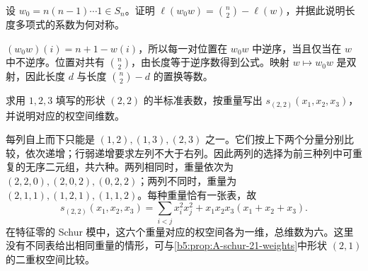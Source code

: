 \begin{exercise}\label{b5:ex:A-longest-complement}
	设 \(w_0=n(n-1)\cdots1\in S_n\)。证明 \(\ell(w_0w)=\binom n2-\ell(w)\)，并据此说明长度多项式的系数为何对称。
\end{exercise}
\begin{solution}
	\((w_0w)(i)=n+1-w(i)\)，所以每一对位置在 \(w_0w\) 中逆序，当且仅当在 \(w\) 中不逆序。位置对共有 \(\binom n2\)，由长度等于逆序数得到公式。映射 \(w\mapsto w_0w\) 是双射，因此长度 \(d\) 与长度 \(\binom n2-d\) 的置换等数。
\end{solution}

\begin{exercise}\label{b5:ex:A-semistandard-21}
	求用 \(1,2,3\) 填写的形状 \((2,2)\) 的半标准表数，按重量写出 \(s_{(2,2)}(x_1,x_2,x_3)\)，并说明对应的权空间维数。
\end{exercise}
\begin{solution}
	每列自上而下只能是 \((1,2),(1,3),(2,3)\) 之一。它们按上下两个分量分别比较，依次递增；行弱递增要求左列不大于右列。因此两列的选择为前三种列中可重复的无序二元组，共六种。两列相同时，重量依次为 \((2,2,0),(2,0,2),(0,2,2)\)；两列不同时，重量为 \((2,1,1),(1,2,1),(1,1,2)\)。每种重量恰有一张表，故
	\[
		s_{(2,2)}(x_1,x_2,x_3) =\sum_{i<j}x_i^2x_j^2+x_1x_2x_3(x_1+x_2+x_3).
	\]
	在特征零的 Schur 模中，这六个重量对应的权空间各为一维，总维数为六。这里没有不同表给出相同重量的情形，可与\cref{b5:prop:A-schur-21-weights}中形状 \((2,1)\) 的二重权空间比较。
\end{solution}

